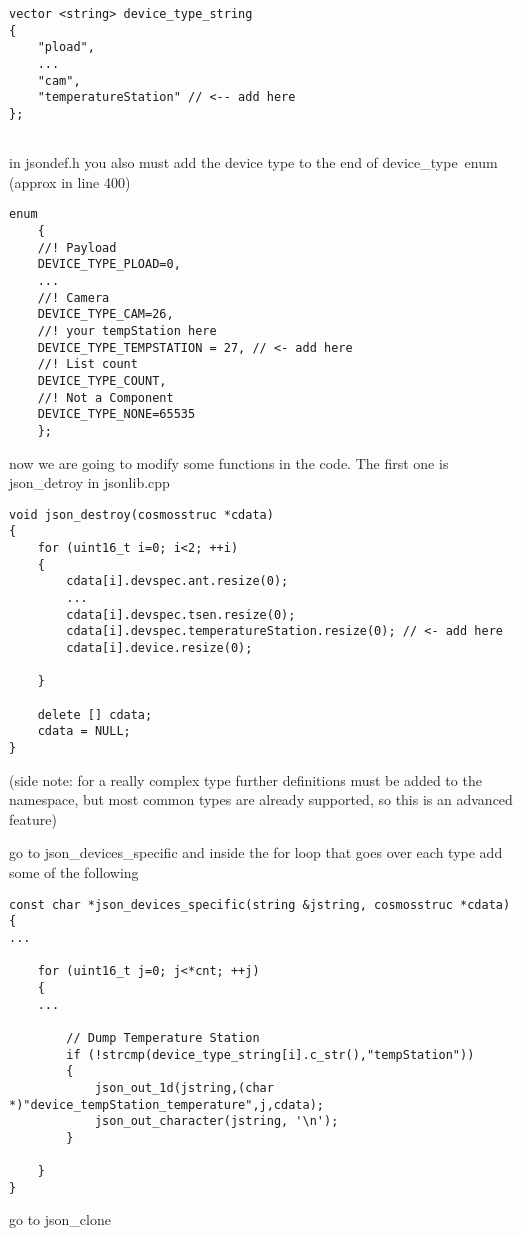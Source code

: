 \documentclass[10pt,letterpaper]{article}
\begin{document}
\begin{lstlisting}
vector <string> device_type_string
{
	"pload",
	...
	"cam",
	"temperatureStation" // <-- add here
};


\end{lstlisting}

in jsondef.h you also must add the device type to the end of device\_type\ enum (approx in line 400)


\begin{lstlisting}
enum
	{
	//! Payload
	DEVICE_TYPE_PLOAD=0,
	...
	//! Camera
	DEVICE_TYPE_CAM=26,
	//! your tempStation here
	DEVICE_TYPE_TEMPSTATION = 27, // <- add here 
	//! List count
	DEVICE_TYPE_COUNT,
	//! Not a Component
	DEVICE_TYPE_NONE=65535
	};

\end{lstlisting}


now we are going to modify some functions in the code. The first one is json\_detroy in jsonlib.cpp


\begin{lstlisting}
void json_destroy(cosmosstruc *cdata)
{
	for (uint16_t i=0; i<2; ++i)
	{
		cdata[i].devspec.ant.resize(0);
		...
		cdata[i].devspec.tsen.resize(0);
		cdata[i].devspec.temperatureStation.resize(0); // <- add here
		cdata[i].device.resize(0);

	}

	delete [] cdata;
	cdata = NULL;
}

\end{lstlisting}

(side note: for a really complex type further definitions must be added to the namespace, but most common types are already supported, so this is an advanced feature)

go to json\_devices\_specific and inside the for loop that goes over each type add some of the following

\begin{lstlisting}
const char *json_devices_specific(string &jstring, cosmosstruc *cdata)
{
...

	for (uint16_t j=0; j<*cnt; ++j)
	{
	...
  
		// Dump Temperature Station
	 	if (!strcmp(device_type_string[i].c_str(),"tempStation"))
	 	{
		 	json_out_1d(jstring,(char *)"device_tempStation_temperature",j,cdata);
	 		json_out_character(jstring, '\n');
	 	}

	} 
}

\end{lstlisting}

go to json\_clone
\end{document}
